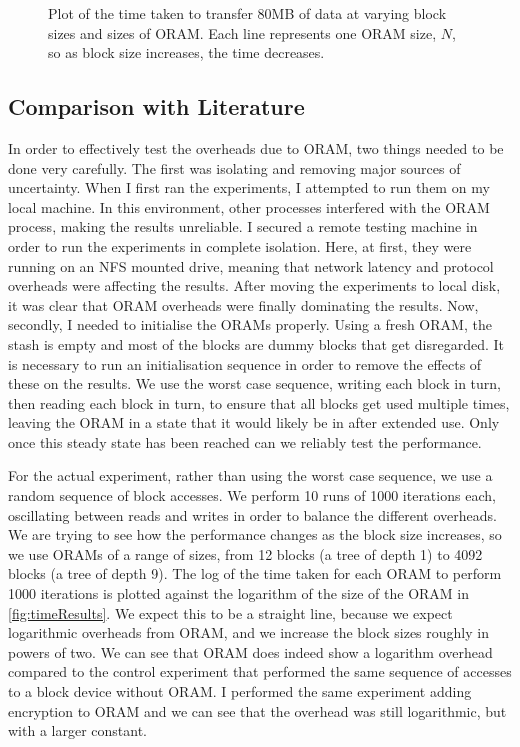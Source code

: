 \documentclass[12pt,a4paper,twoside,openright]{report}
\begin{document}
\begin{figure}
    \centering
    
    \caption{Plot of the time taken to transfer 80MB of data at varying block sizes and sizes of ORAM. Each line represents one ORAM size, $N$, so as block size increases, the time decreases.}
    \label{fig:blockSizeResults}
\end{figure}

\subsection{Comparison with Literature}
\label{subsec:comparisonWithLiterature}

In order to effectively test the overheads due to ORAM, two things needed to be done very carefully. The first was isolating and removing major sources of uncertainty. When I first ran the experiments, I attempted to run them on my local machine. In this environment, other processes interfered with the ORAM process, making the results unreliable. I secured a remote testing machine in order to run the experiments in complete isolation. Here, at first, they were running on an NFS mounted drive, meaning that network latency and protocol overheads were affecting the results. After moving the experiments to local disk, it was clear that ORAM overheads were finally dominating the results. Now, secondly, I needed to initialise the ORAMs properly. Using a fresh ORAM, the stash is empty and most of the blocks are dummy blocks that get disregarded. It is necessary to run an initialisation sequence in order to remove the effects of these on the results. We use the worst case sequence, writing each block in turn, then reading each block in turn, to ensure that all blocks get used multiple times, leaving the ORAM in a state that it would likely be in after extended use. Only once this steady state has been reached can we reliably test the performance.

For the actual experiment, rather than using the worst case sequence, we use a random sequence of block accesses. We perform 10 runs of 1000 iterations each, oscillating between reads and writes in order to balance the different overheads. We are trying to see how the performance changes as the block size increases, so we use ORAMs of a range of sizes, from 12 blocks (a tree of depth 1) to 4092 blocks (a tree of depth 9). The log of the time taken for each ORAM to perform 1000 iterations is plotted against the logarithm of the size of the ORAM in \cref{fig:timeResults}. We expect this to be a straight line, because we expect logarithmic overheads from ORAM, and we increase the block sizes roughly in powers of two. We can see that ORAM does indeed show a logarithm overhead compared to the control experiment that performed the same sequence of accesses to a block device without ORAM. I performed the same experiment adding encryption to ORAM and we can see that the overhead was still logarithmic, but with a larger constant.
\end{document}
